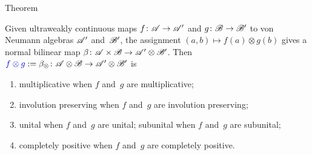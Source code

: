 \documentclass[a]{subfiles}
\begin{document}
\begin{parsec}
\begin{point}{Theorem}
\begin{enumerate}
\end{enumerate}
Given ultraweakly continuous maps $f\colon \mathscr{A}\to\mathscr{A}'$
and $g\colon \mathscr{B}\to\mathscr{B}'$
to von Neumann algebras $\mathscr{A}'$ and~$\mathscr{B}'$,
the assignment $(a,b)\mapsto f(a)\otimes g(b)$
gives a normal bilinear map 
$\beta\colon \mathscr{A}\times \mathscr{B}\to \mathscr{A}'\otimes \mathscr{B}'$.
Then $\Define{f\otimes g}:=\beta_\otimes\colon \scrA\otimes \scrB
\to\scrA'\otimes \scrB'$
is
\begin{enumerate}
\item multiplicative
when $f$ and~$g$ are multiplicative;
\item involution preserving
when $f$ and~$g$ are involution preserving;
\item unital when $f$ and~$g$ are unital;
	subunital when $f$ and~$g$ are subunital;
\item completely positive when $f$ and~$g$ are completely positive.
\end{enumerate}
\end{point}
\end{parsec}
\end{document}
